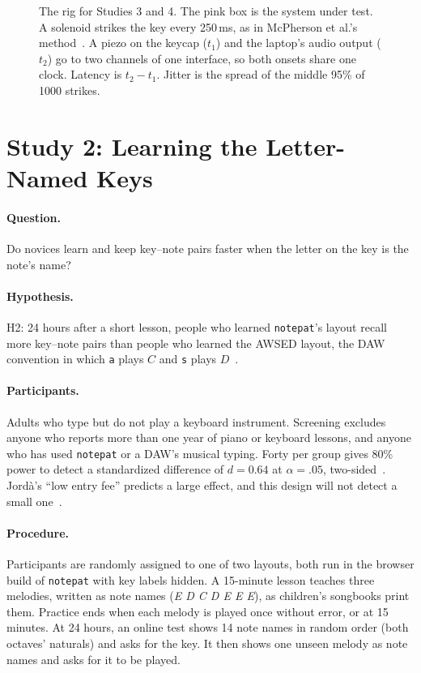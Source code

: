 \documentclass[10pt,letterpaper,twocolumn]{article}
\newcommand{\np}{\texttt{notepat}}
\newcommand{\key}[1]{\texttt{#1}}
\begin{document}
\begin{figure}[t]
\centering

\caption{The rig for Studies 3 and 4. The pink box is the system under test. A solenoid strikes the key every 250\,ms, as in McPherson et al.'s method~\citep{mcpherson2016latency}. A piezo on the keycap ($t_1$) and the laptop's audio output ($t_2$) go to two channels of one interface, so both onsets share one clock. Latency is $t_2 - t_1$. Jitter is the spread of the middle 95\% of 1000 strikes.}
\label{fig:rig}
\end{figure}

\section{Study 2: Learning the Letter-Named Keys}
\label{sec:s2}

\paragraph{Question.} Do novices learn and keep key--note pairs faster when the letter on the key is the note's name?

\paragraph{Hypothesis.} H2: 24 hours after a short lesson, people who learned \np{}'s layout recall more key--note pairs than people who learned the AWSED layout, the DAW convention in which \key{a} plays $C$ and \key{s} plays $D$~\citep{scudder2026keymaps}.

\paragraph{Participants.} Adults who type but do not play a keyboard instrument. Screening excludes anyone who reports more than one year of piano or keyboard lessons, and anyone who has used \np{} or a DAW's musical typing. Forty per group gives 80\% power to detect a standardized difference of $d = 0.64$ at $\alpha = .05$, two-sided~\citep{cohen1988power}. Jordà's ``low entry fee'' predicts a large effect, and this design will not detect a small one~\citep{jorda2004efficiency}.

\paragraph{Procedure.} Participants are randomly assigned to one of two layouts, both run in the browser build of \np{} with key labels hidden. A 15-minute lesson teaches three melodies, written as note names (\emph{E D C D E E E}), as children's songbooks print them. Practice ends when each melody is played once without error, or at 15 minutes. At 24 hours, an online test shows 14 note names in random order (both octaves' naturals) and asks for the key. It then shows one unseen melody as note names and asks for it to be played.
\end{document}
